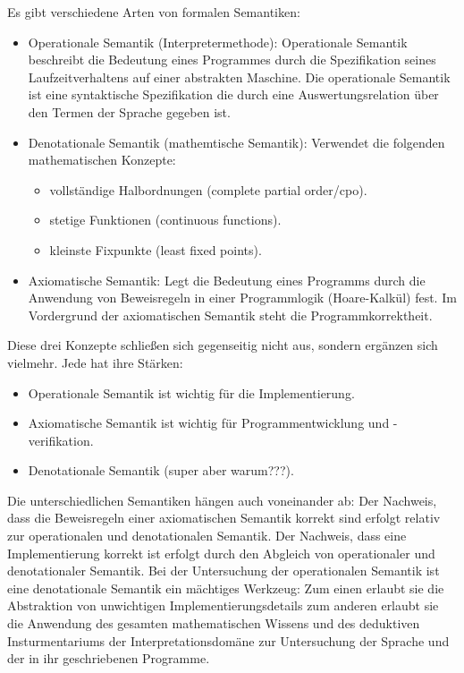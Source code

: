 \documentclass{scrartcl}
\begin{document}
Es gibt verschiedene Arten von formalen Semantiken:
\begin{itemize}
\item Operationale Semantik (Interpretermethode):
	Operationale Semantik beschreibt die Bedeutung eines Programmes
	durch die Spezifikation seines Laufzeitverhaltens auf einer abstrakten Maschine.
	Die operationale Semantik ist eine syntaktische Spezifikation die durch 
	eine Auswertungsrelation über den Termen der Sprache gegeben ist.
\item Denotationale Semantik (mathemtische Semantik):
	Verwendet die folgenden mathematischen Konzepte:
	\begin{itemize}
	\item vollständige Halbordnungen (complete partial order/cpo).
	\item stetige Funktionen (continuous functions).
	\item kleinste Fixpunkte (least fixed points).
	\end{itemize}
\item Axiomatische Semantik:
	Legt die Bedeutung eines Programms durch die Anwendung von
	Beweisregeln in einer Programmlogik (Hoare-Kalkül) fest.
	Im Vordergrund der axiomatischen Semantik steht die Programmkorrektheit.
\end{itemize}

Diese drei Konzepte schließen sich gegenseitig nicht aus, sondern ergänzen sich
vielmehr. Jede hat ihre Stärken:
\begin{itemize}
\item Operationale Semantik ist wichtig für die Implementierung.
\item Axiomatische Semantik ist wichtig für Programmentwicklung und -verifikation.
\item Denotationale Semantik (super aber warum???).
\end{itemize}

Die unterschiedlichen Semantiken hängen auch voneinander ab:
Der Nachweis, dass die Beweisregeln einer axiomatischen Semantik korrekt sind
erfolgt relativ zur operationalen und denotationalen Semantik.
Der Nachweis, dass eine Implementierung korrekt ist 
erfolgt durch den Abgleich von operationaler und denotationaler Semantik.
Bei der Untersuchung der operationalen Semantik ist eine denotationale 
Semantik ein mächtiges Werkzeug:
Zum einen erlaubt sie die Abstraktion von unwichtigen Implementierungsdetails
zum anderen erlaubt sie die Anwendung des gesamten mathematischen 
Wissens und des deduktiven Insturmentariums der Interpretationsdomäne zur 
Untersuchung der Sprache und der in ihr geschriebenen Programme.
\end{document}
